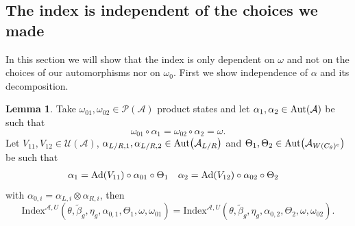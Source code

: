 \documentclass[12pt,a4paper,twoside]{article}
\let\originalleft\left
\let\originalright\right
\renewcommand{\left}{\mathopen{}\mathclose\bgroup\originalleft}
\renewcommand{\right}{\aftergroup\egroup\originalright}
\newcommand{\UU}{\mathcal U}
\newcommand{\PP}{\mathcal P}
\renewcommand{\AA}{\mathcal A}
\newcommand{\Ad}[1]{\textrm{Ad}\left(#1\right)}
\newcommand{\Aut}[1]{\textrm{Aut}\left(#1\right)}
\theoremstyle{definition}
\newtheorem{lemma}[theorem]{Lemma}
\numberwithin{equation}{section}
\begin{document}
\subsection{The index is independent of the choices we made}\label{sec:IndexIsInvariantUnderChoices}
In this section we will show that the index is only dependent on $\omega$ and not on the choices of our automorphisms nor on $\omega_0$. First we show independence of $\alpha$ and its decomposition.
\begin{lemma}
	Take $\omega_{01},\omega_{02}\in\PP(\AA)$ product states and let $\alpha_1,\alpha_2\in\Aut{\AA}$ be such that
	\begin{equation}
		\omega_{01}\circ\alpha_1=\omega_{02}\circ\alpha_2=\omega.
	\end{equation}
	Let $V_{11},V_{12}\in\UU(\AA)$, $\alpha_{L/R,1},\alpha_{L/R,2}\in\Aut{\AA_{L/R}}$ and $\Theta_1,\Theta_2\in \Aut{\AA_{W(C_\theta)^c}}$ be such that
	\begin{align}
		\alpha_1&=\Ad{V_{11}}\circ\alpha_{01}\circ\Theta_1&\alpha_2&=\Ad{V_{12}}\circ\alpha_{02}\circ \Theta_2
	\end{align}
	with $\alpha_{0,i}=\alpha_{L,i}\otimes\alpha_{R,i}$, then
	\begin{equation}
		\textrm{Index}^{\AA,U}(\theta,\tilde{\beta}_g,\eta_g,\alpha_{0,1},\Theta_1,\omega,\omega_{01})=\textrm{Index}^{\AA,U}(\theta,\tilde{\beta}_g,\eta_g,\alpha_{0,2},\Theta_2,\omega,\omega_{02}).
	\end{equation}
\end{lemma}
\end{document}
